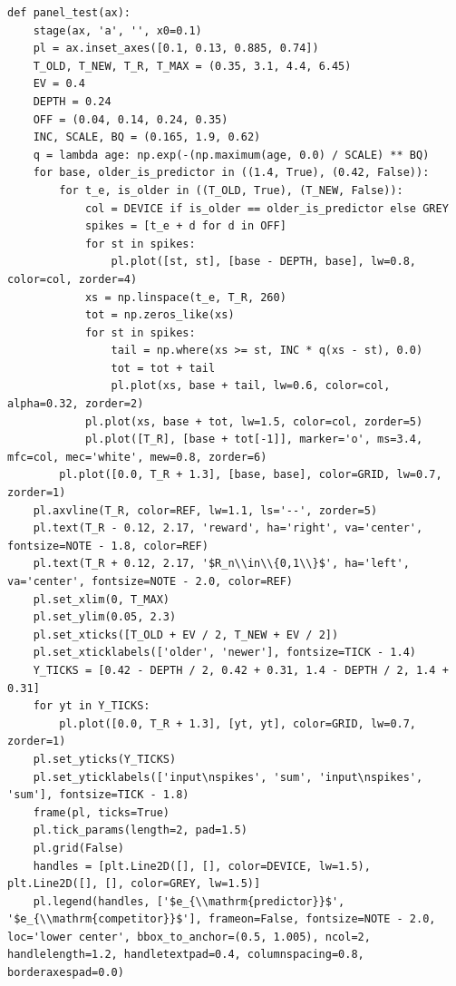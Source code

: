 \documentclass[a4paper,10pt]{article}
\begin{document}
\begin{Verbatim}
def panel_test(ax):
    stage(ax, 'a', '', x0=0.1)
    pl = ax.inset_axes([0.1, 0.13, 0.885, 0.74])
    T_OLD, T_NEW, T_R, T_MAX = (0.35, 3.1, 4.4, 6.45)
    EV = 0.4
    DEPTH = 0.24
    OFF = (0.04, 0.14, 0.24, 0.35)
    INC, SCALE, BQ = (0.165, 1.9, 0.62)
    q = lambda age: np.exp(-(np.maximum(age, 0.0) / SCALE) ** BQ)
    for base, older_is_predictor in ((1.4, True), (0.42, False)):
        for t_e, is_older in ((T_OLD, True), (T_NEW, False)):
            col = DEVICE if is_older == older_is_predictor else GREY
            spikes = [t_e + d for d in OFF]
            for st in spikes:
                pl.plot([st, st], [base - DEPTH, base], lw=0.8, color=col, zorder=4)
            xs = np.linspace(t_e, T_R, 260)
            tot = np.zeros_like(xs)
            for st in spikes:
                tail = np.where(xs >= st, INC * q(xs - st), 0.0)
                tot = tot + tail
                pl.plot(xs, base + tail, lw=0.6, color=col, alpha=0.32, zorder=2)
            pl.plot(xs, base + tot, lw=1.5, color=col, zorder=5)
            pl.plot([T_R], [base + tot[-1]], marker='o', ms=3.4, mfc=col, mec='white', mew=0.8, zorder=6)
        pl.plot([0.0, T_R + 1.3], [base, base], color=GRID, lw=0.7, zorder=1)
    pl.axvline(T_R, color=REF, lw=1.1, ls='--', zorder=5)
    pl.text(T_R - 0.12, 2.17, 'reward', ha='right', va='center', fontsize=NOTE - 1.8, color=REF)
    pl.text(T_R + 0.12, 2.17, '$R_n\\in\\{0,1\\}$', ha='left', va='center', fontsize=NOTE - 2.0, color=REF)
    pl.set_xlim(0, T_MAX)
    pl.set_ylim(0.05, 2.3)
    pl.set_xticks([T_OLD + EV / 2, T_NEW + EV / 2])
    pl.set_xticklabels(['older', 'newer'], fontsize=TICK - 1.4)
    Y_TICKS = [0.42 - DEPTH / 2, 0.42 + 0.31, 1.4 - DEPTH / 2, 1.4 + 0.31]
    for yt in Y_TICKS:
        pl.plot([0.0, T_R + 1.3], [yt, yt], color=GRID, lw=0.7, zorder=1)
    pl.set_yticks(Y_TICKS)
    pl.set_yticklabels(['input\nspikes', 'sum', 'input\nspikes', 'sum'], fontsize=TICK - 1.8)
    frame(pl, ticks=True)
    pl.tick_params(length=2, pad=1.5)
    pl.grid(False)
    handles = [plt.Line2D([], [], color=DEVICE, lw=1.5), plt.Line2D([], [], color=GREY, lw=1.5)]
    pl.legend(handles, ['$e_{\\mathrm{predictor}}$', '$e_{\\mathrm{competitor}}$'], frameon=False, fontsize=NOTE - 2.0, loc='lower center', bbox_to_anchor=(0.5, 1.005), ncol=2, handlelength=1.2, handletextpad=0.4, columnspacing=0.8, borderaxespad=0.0)


\end{Verbatim}
\end{document}
